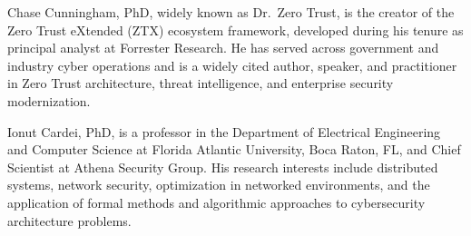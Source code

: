 \documentclass[unnumsec,webpdf,contemporary,large]{oup-authoring-template}
\theoremstyle{thmstyleone}
\theoremstyle{thmstyletwo}
\theoremstyle{thmstylethree}
\begin{document}
\begin{biography}{}{\author{Chase Cunningham, PhD.} Chase Cunningham, PhD, widely known as Dr.\ Zero Trust, is the creator of the Zero Trust
eXtended (ZTX) ecosystem framework, developed during his tenure as principal analyst at
Forrester Research. He has served across government and industry cyber operations and is
a widely cited author, speaker, and practitioner in Zero Trust architecture, threat
intelligence, and enterprise security modernization.}
\end{biography}

\begin{biography}{}{\author{Ionut Cardei, PhD.} Ionut Cardei, PhD, is a professor in the Department of Electrical Engineering and Computer
Science at Florida Atlantic University, Boca Raton, FL, and Chief Scientist at Athena
Security Group. His research interests include distributed systems, network security,
optimization in networked environments, and the application of formal methods and
algorithmic approaches to cybersecurity architecture problems.
}
\end{biography}
\end{document}
